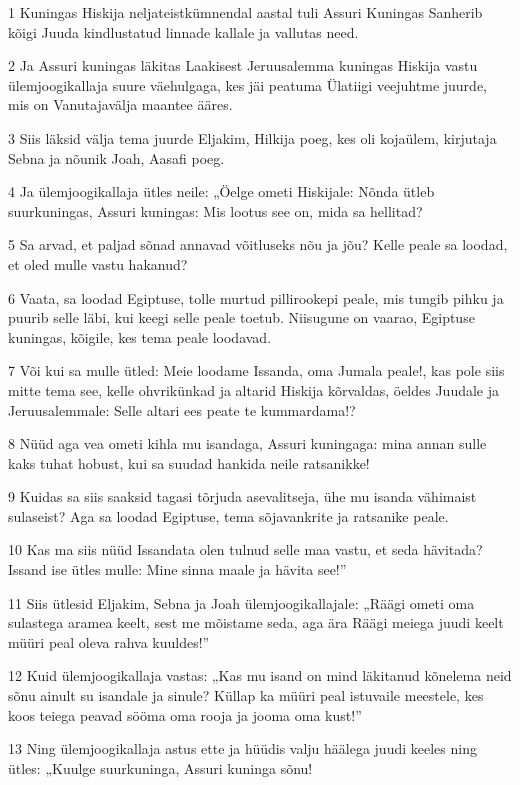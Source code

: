 \par 1 Kuningas Hiskija neljateistkümnendal aastal tuli Assuri Kuningas Sanherib kõigi Juuda kindlustatud linnade kallale ja vallutas need.
\par 2 Ja Assuri kuningas läkitas Laakisest Jeruusalemma kuningas Hiskija vastu ülemjoogikallaja suure väehulgaga, kes jäi peatuma Ülatiigi veejuhtme juurde, mis on Vanutajavälja maantee ääres.
\par 3 Siis läksid välja tema juurde Eljakim, Hilkija poeg, kes oli kojaülem, kirjutaja Sebna ja nõunik Joah, Aasafi poeg.
\par 4 Ja ülemjoogikallaja ütles neile: „Öelge ometi Hiskijale: Nõnda ütleb suurkuningas, Assuri kuningas: Mis lootus see on, mida sa hellitad?
\par 5 Sa arvad, et paljad sõnad annavad võitluseks nõu ja jõu? Kelle peale sa loodad, et oled mulle vastu hakanud?
\par 6 Vaata, sa loodad Egiptuse, tolle murtud pillirookepi peale, mis tungib pihku ja puurib selle läbi, kui keegi selle peale toetub. Niisugune on vaarao, Egiptuse kuningas, kõigile, kes tema peale loodavad.
\par 7 Või kui sa mulle ütled: Meie loodame Issanda, oma Jumala peale!, kas pole siis mitte tema see, kelle ohvrikünkad ja altarid Hiskija kõrvaldas, öeldes Juudale ja Jeruusalemmale: Selle altari ees peate te kummardama!?
\par 8 Nüüd aga vea ometi kihla mu isandaga, Assuri kuningaga: mina annan sulle kaks tuhat hobust, kui sa suudad hankida neile ratsanikke!
\par 9 Kuidas sa siis saaksid tagasi tõrjuda asevalitseja, ühe mu isanda vähimaist sulaseist? Aga sa loodad Egiptuse, tema sõjavankrite ja ratsanike peale.
\par 10 Kas ma siis nüüd Issandata olen tulnud selle maa vastu, et seda hävitada? Issand ise ütles mulle: Mine sinna maale ja hävita see!”
\par 11 Siis ütlesid Eljakim, Sebna ja Joah ülemjoogikallajale: „Räägi ometi oma sulastega aramea keelt, sest me mõistame seda, aga ära Räägi meiega juudi keelt müüri peal oleva rahva kuuldes!”
\par 12 Kuid ülemjoogikallaja vastas: „Kas mu isand on mind läkitanud kõnelema neid sõnu ainult su isandale ja sinule? Küllap ka müüri peal istuvaile meestele, kes koos teiega peavad sööma oma rooja ja jooma oma kust!”
\par 13 Ning ülemjoogikallaja astus ette ja hüüdis valju häälega juudi keeles ning ütles: „Kuulge suurkuninga, Assuri kuninga sõnu!
